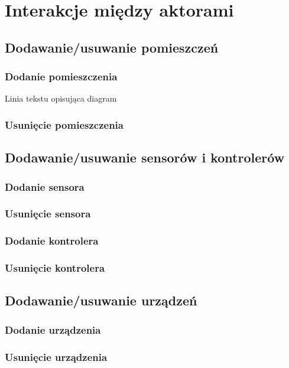 \chapter{Interakcje między aktorami}

\section{Dodawanie/usuwanie pomieszczeń}
\subsection*{Dodanie pomieszczenia}
Linia tekstu opisująca diagram 

\subsection*{Usunięcie pomieszczenia}

\section{Dodawanie/usuwanie sensorów i kontrolerów}
\subsection*{Dodanie sensora}

\subsection*{Usunięcie sensora}
\subsection*{Dodanie kontrolera}
\subsection*{Usunięcie kontrolera}

\section{Dodawanie/usuwanie urządzeń}
\subsection*{Dodanie urządzenia}
\subsection*{Usunięcie urządzenia}

